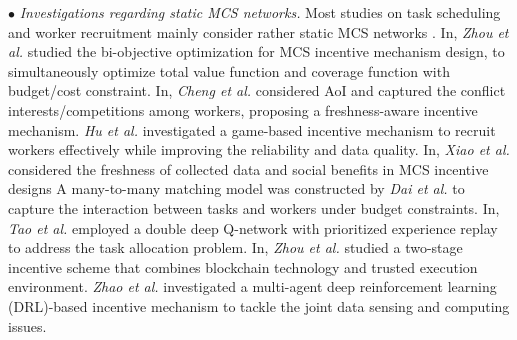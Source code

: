 \noindent
$\bullet$ \textit{Investigations regarding static MCS networks.} Most studies on task scheduling and worker recruitment mainly consider rather static MCS networks \cite{Incentive 1,Incentive 2,Incentive 3,RWork_stable 4,RWork_stable 5,RWork_stable 6}.
In\cite{Incentive 1}, \textit{Zhou et al.} studied the bi-objective optimization for MCS incentive mechanism design, to simultaneously optimize total value function and coverage function with budget/cost constraint.
In\cite{Incentive 2}, \textit{Cheng et al.} considered AoI and captured the conflict interests/competitions among workers, proposing a freshness-aware incentive mechanism.
\textit{Hu et al.\cite{Incentive 3}} investigated a game-based incentive mechanism to recruit workers effectively while improving the reliability and data quality.
In\cite{RWork_stable 4}, \textit{Xiao et al.} considered the freshness of collected data and social benefits in MCS incentive designs
A many-to-many matching model was constructed by \textit{Dai et al.} \cite{RWork_stable 5} to capture the interaction between tasks and workers under budget constraints.
In\cite{RWork_stable 6}, \textit{Tao et al.} employed a double deep Q-network with prioritized experience replay to address the task allocation problem.
In\cite{RWork_stable 7}, \textit{Zhou et al.} studied a two-stage incentive scheme that combines blockchain technology and trusted execution environment.
\textit{Zhao et al.} \cite{RWork_stable 8} investigated a multi-agent deep reinforcement learning (DRL)-based incentive mechanism to tackle the joint data sensing and computing issues.


